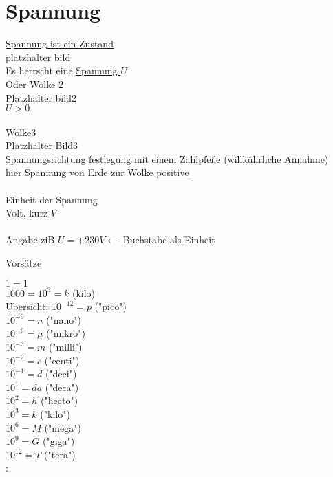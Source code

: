 \section{Spannung}
\underline{Spannung ist ein Zustand}\\
platzhalter bild\\
Es herrscht eine \underline{Spannung $U$}\\
Oder Wolke 2\\
Platzhalter bild2\\
$ U > 0 $\\
\\

Wolke3\\
Platzhalter Bild3\\

Spannungsrichtung festlegung mit einem Zählpfeile (\underline{willkührliche Annahme})\\
hier Spannung von Erde zur Wolke \underline{positive}\\
\\
Einheit der Spannung\\
Volt, kurz $V$\\
\\
Angabe ziB $U = + 230 V \leftarrow $ Buchstabe als Einheit\\

\newpage

Vorsätze

$ 1 =1 $\\
$ 1000 = 10^3 = k $ (kilo)\\
Übersicht:
$ 10^{-12} = p $ ("pico")\\
$ 10^{-9} = n $ ("nano")\\
$ 10^{-6} = \mu $ ("mikro")\\
$ 10^{-3} = m $ ("milli")\\
$ 10^{-2} = c $ ("centi")\\
$ 10^{-1} = d $ ("deci")\\
$ 10^{1} = da $ ("deca")\\
$ 10^{2} = h $ ("hecto")\\
$ 10^{3} = k $ ("kilo")\\
$ 10^{6} = M $ ("mega")\\
$ 10^{9} = G $ ("giga")\\
$ 10^{12} = T $ ("tera")\\:



